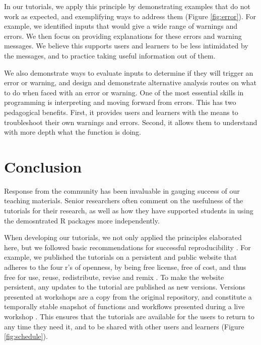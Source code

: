 \documentclass[12pt]{article}
\begin{document}
In our tutorials, we apply this principle by demonstrating examples that do not work as expected, and exemplifying ways to address them (Figure \ref{fig:error}).
For example, we identified inputs that would give a wide range of warnings and errors. We then focus on providing explanations for these errors and warning messages. We believe this supports users and learners to be less intimidated by the messages, and to practice taking useful information out of them.

We also demonstrate ways to evaluate inputs to determine if they will trigger an error or warning, and design and demonstrate alternative analysis routes on what to do when faced with an error or warning.
One of the most essential skills in programming is interpreting and moving forward from errors.
This has two pedagogical benefits. First, it provides users and learners with the means to troubleshoot their own warnings and errors. Second, it allows them to understand with more depth what the function is doing.








\section*{Conclusion}
\label{sec:conclusion}

Response from the community has been invaluable in gauging success of our teaching materials.
Senior researchers often comment on the usefulness of the tutorials for their research, as well as how they have supported students in using the demosntrated R packages more independently.

When developing our tutorials, we not only applied the principles elaborated here,
but we followed basic recommendations for successful reproducibility \citep{sandve2013ten}.
For example, we published the tutorials on a persistent and public website \citep{RopentreeTutorials} that adheres to the four r's of openness, by being free license, free of cost, and thus free for use, reuse, redistribute, revise and remix \citep{hilton2010four}.
To make the website persistent, any updates to the tutorial are published as new versions.
Versions presented at workshops are a copy from the original repository, and constitute a temporally stable snapshot of functions and workflows presented during a live workshop \citep{wilson2006swc, SWCwebsite}.
This ensures that the tutorials are available for the users to return to any time they need it, and to be shared with other users and learners (Figure \ref{fig:schedule}).
\end{document}
